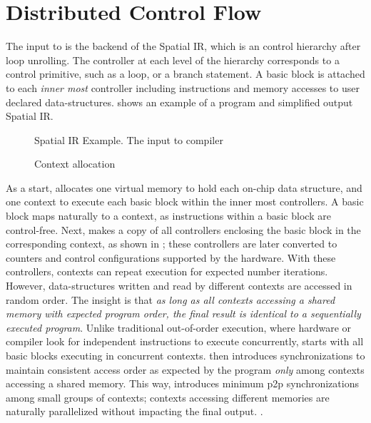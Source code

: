 \section{Distributed Control Flow}
\label{sec:control}

The input to \name is the backend of the Spatial IR, which is an control hierarchy after loop
unrolling.
The controller at each level of the hierarchy corresponds to a control primitive, such as a loop, or
a branch statement. A basic block is attached to each \emph{inner most} controller including instructions
and memory accesses to user declared data-structures.
 shows an example of a program and simplified output Spatial IR.

\begin{figure}
\centering
\caption[Spatial IR example]{Spatial IR Example. The input to \name compiler}
\label{fig:spatialir}
\end{figure}

\begin{figure}
\centering
\caption[Context allocation]{Context allocation}
\label{fig:contextalloc}
\end{figure}

As a start, \name allocates one virtual memory to hold each on-chip data structure, and 
one context to execute each basic block within the inner most controllers. 
A basic block maps naturally to a context, as instructions within a basic block are control-free. 
Next, \name makes a copy of all controllers enclosing the basic block in the corresponding context, as
shown in ;
these controllers are later converted to counters and control configurations supported by the
hardware. 
With these controllers, contexts can repeat execution for expected number iterations. However,
data-structures written and read by different contexts are accessed in random order.
The insight is that \emph{as long as all contexts accessing a shared memory with expected program order,
the final result is identical to a sequentially executed program}.
Unlike traditional out-of-order execution, where hardware or compiler look for independent instructions to
execute concurrently, \name starts with all basic blocks executing in concurrent contexts.
\name then introduces synchronizations to maintain consistent access order as expected by the 
program \emph{only} among contexts accessing a shared memory. 
This way, \name introduces minimum p2p synchronizations among small groups of contexts; contexts
accessing different memories are naturally parallelized without impacting the final output.
.

